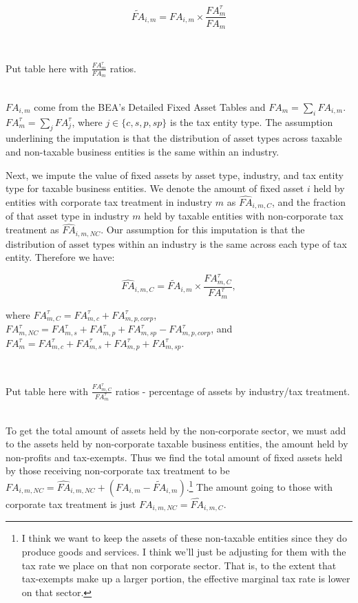 \documentclass[article,11pt,letterpaper,fleqn]{article}
\theoremstyle{definition}
\numberwithin{equation}{section}
\begin{document}
\begin{equation}
\widetilde{FA}_{i,m}={FA}_{i,m}\times \frac{{FA}^{\tau}_{m}}{{FA}_{m}}
\end{equation}

\ \\
\begin{center}
Put table here with $\frac{{FA}^{\tau}_{m}}{{FA}_{m}}$ ratios.
\end{center}
\ \\

\noindent\noindent  ${FA}_{i,m}$ come from the BEA's Detailed Fixed Asset Tables and ${FA}_{m}=\sum_{i}{FA}_{i,m}$.  ${FA}^{\tau}_{m}=\sum_{j}{FA}^{\tau}_{j}$, where $j\in\{c,s,p,sp\}$ is the tax entity type.  The assumption underlining the imputation is that the distribution of asset types across taxable and non-taxable business entities is the same within an industry.

Next, we impute the value of fixed assets by asset type, industry, and tax entity type for taxable business entities.  We denote the amount of fixed asset $i$ held by entities with corporate tax treatment in industry $m$ as $\widehat{FA}_{i,m,C}$, and the fraction of that asset type in industry $m$ held by taxable entities with non-corporate tax treatment as $\widehat{FA}_{i,m,NC}$.  Our assumption for this imputation is that the distribution of asset types within an industry is the same across each type of tax entity.  Therefore we have: 

\begin{equation}
\widehat{FA}_{i,m,C}=\widetilde{FA}_{i,m} \times \frac{{FA}^{\tau}_{m,C}}{{FA}^{\tau}_{m}},
\end{equation} 


\noindent\noindent where ${FA}^{\tau}_{m,C}={FA}^{\tau}_{m,c}+{FA}^{\tau}_{m,p,corp}$, ${FA}^{\tau}_{m,NC}={FA}^{\tau}_{m,s}+{FA}^{\tau}_{m,p}+{FA}^{\tau}_{m,sp}-{FA}^{\tau}_{m,p,corp}$, and ${FA}^{\tau}_{m}={FA}^{\tau}_{m,c}+{FA}^{\tau}_{m,s}+{FA}^{\tau}_{m,p}+{FA}^{\tau}_{m,sp}$.

\ \\
\begin{center}
Put table here with $\frac{{FA}^{\tau}_{m,C}}{{FA}^{\tau}_{m}}$ ratios - percentage of assets by industry/tax treatment.
\end{center}
\ \\

To get the total amount of assets held by the non-corporate sector, we must add to the assets held by non-corporate taxable business entities, the amount held by non-profits and tax-exempts.  Thus we find the total amount of fixed assets held by those receiving non-corporate tax treatment to be ${FA}_{i,m,NC}=\widehat{FA}_{i,m,NC}+({FA}_{i,m}-\widetilde{FA}_{i,m})$.\footnote{I think we want to keep the assets of these non-taxable entities since they do produce goods and services. I think we'll just be adjusting for them with the tax rate we place on that non corporate sector.  That is, to the extent that tax-exempts make up a larger portion, the effective marginal tax rate is lower on that sector.}  The amount going to those with corporate tax treatment is just ${FA}_{i,m,NC}=\widehat{FA}_{i,m,C}$.
\end{document}
